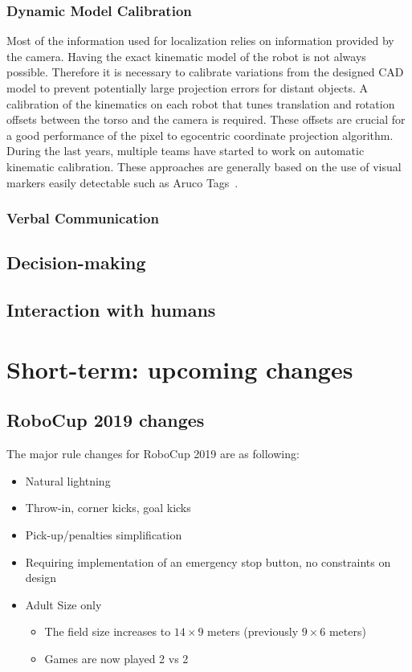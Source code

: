 \documentclass{article}
\begin{document}
\subsubsection{Dynamic Model Calibration}
Most of the information used for localization relies on information provided by the camera. 
Having the exact kinematic model of the robot is not always possible. 
Therefore it is necessary to calibrate variations from the designed CAD model to prevent potentially large projection errors for distant objects. 
A calibration of the kinematics on each robot that tunes translation and rotation offsets between the torso and the camera is required. 
These offsets are crucial for a good performance of the pixel to egocentric coordinate projection algorithm.
During the last years, multiple teams have started to work on automatic kinematic calibration. 
These approaches are generally based on the use of visual markers easily detectable such as Aruco Tags~\cite{Garrido-Jurado2014}.

\subsubsection{Verbal Communication}

\subsection{Decision-making}

\subsection{Interaction with humans}

\section{\label{sec:ShortTerm}Short-term: upcoming changes}

\subsection{RoboCup 2019 changes}

The major rule changes for RoboCup 2019 are as following:

\begin{itemize}
\item Natural lightning
\item Throw-in, corner kicks, goal kicks %
\item Pick-up/penalties simplification
\item Requiring implementation of an emergency stop button, no constraints on design
\item Adult Size only
  \begin{itemize}
  \item The field size increases to $14 \times 9$ meters (previously $9 \times 6$ meters)
  \item Games are now played 2 vs 2
  \end{itemize}
\end{itemize}
\end{document}
